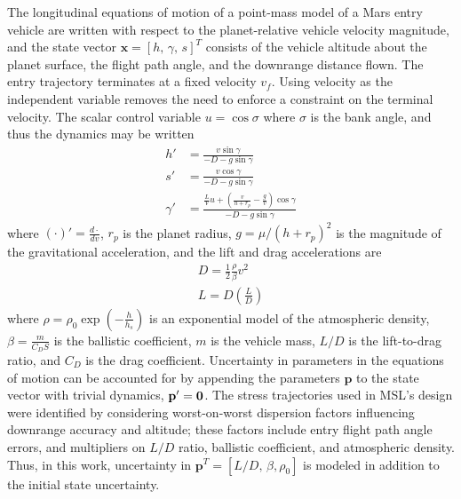 \documentclass[journal ]{new-aiaa}
\newcommand{\state}{\ensuremath{\mathbf{x}}}
\newcommand{\param}{\ensuremath{\mathbf{p}}}
\begin{document}
The longitudinal equations of motion of a point-mass model of a Mars entry vehicle are written with respect to the planet-relative vehicle velocity magnitude, and the state vector $\state=[h,\,\gamma,\, s]^T$ consists of the vehicle altitude about the planet surface, the flight path angle, and the downrange distance flown. The entry trajectory terminates at a fixed velocity $v_f$. Using velocity as the independent variable removes the need to enforce a constraint on the terminal velocity. The scalar control variable $u=\cos\sigma$ where $\sigma$ is the bank angle, and thus the dynamics may be written
\begin{align}
h' &= \frac{v\sin\gamma}{-D - g\sin\gamma} \label{eq_dynamics_altitude}\\
s' &= \frac{v\cos\gamma}{-D - g\sin\gamma} \\
\gamma' &= \frac{\frac{L}{V}u + \left(\frac{v}{h+r_p}-\frac{g}{v}\right)\cos\gamma}{-D - g\sin\gamma} \label{eq_dynamics_fpa}
\end{align}
where $(\cdot)' = \frac{d\cdot}{dv}$, $r_p$ is the planet radius, $g=\mu/(h+r_p)^2$ is the magnitude of the gravitational acceleration, and the lift and drag accelerations are
\begin{align}
D = \frac{1}{2}\frac{\rho}{\beta} v^2 \\
L = D(\frac{L}{D})
\end{align}
where $\rho=\rho_0\exp\left(-\frac{h}{h_s}\right)$ is an exponential model of the atmospheric density, $\beta=\frac{m}{C_DS}$ is the ballistic coefficient, $m$ is the vehicle mass, $L/D$ is the lift-to-drag ratio, and $C_D$ is the drag coefficient.
Uncertainty in parameters in the equations of motion can be accounted for by appending the parameters $\param$ to the state vector with trivial dynamics, $\param'=\bf0$. The stress trajectories used in MSL's design were identified by considering worst-on-worst dispersion factors influencing downrange accuracy and altitude\cite{MSL_EDL2}; these factors include entry flight path angle errors, and multipliers on $L/D$ ratio, ballistic coefficient, and atmospheric density. Thus, in this work, uncertainty in $\param^T = [L/D,\,\beta,\rho_0]$ is modeled in addition to the initial state uncertainty. 
\end{document}
